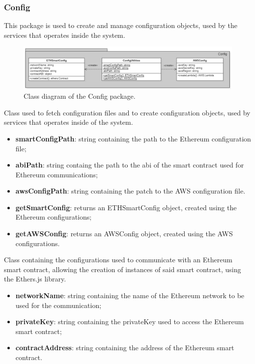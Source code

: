 	\subsubsection{Config}
	This package is used to create and manage configuration objects, used by the services that operates inside the system.
	\begin{figure} [h!]
		\centering
		\includegraphics[width=1\linewidth]{diagrammi/etherless-server/Config}
		\caption{Class diagram of the Config package.}
	\end{figure}
	Class used to fetch configuration files and to create configuration objects, used by services that operates inside of the system.
	\begin{itemize}
		\item \textbf{smartConfigPath}: string containing the path to the Ethereum configuration file;
		\item \textbf{abiPath}: string containg the path to the abi of the smart contract used for Ethereum communications;
		\item \textbf{awsConfigPath}: string containing the patch to the AWS configuration file.
	\end{itemize}
	\begin{itemize}
		\item \textbf{getSmartConfig}: returns an ETHSmartConfig object, created using the Ethereum configurations;
		\item \textbf{getAWSConfig}: returns an AWSConfig object, created using the AWS configurations.
	\end{itemize}
	Class containing the configurations used to communicate with an Ethereum smart contract, allowing the creation of instances of said smart contract, using the Ethers.js library.
	\begin{itemize}
		\item \textbf{networkName}: string containing the name of the Ethereum network to be used for the communication;
		\item \textbf{privateKey}: string containing the privateKey used to access the Ethereum smart contract;
		\item \textbf{contractAddress}: string containing the address of the Ethereum smart contract.
	\end{itemize}
